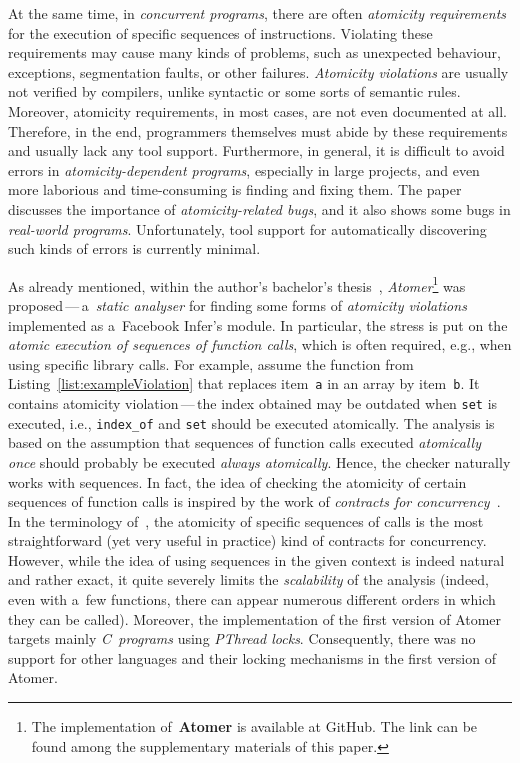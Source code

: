 \documentclass{ExcelAtFIT}
\theoremstyle{example}
\begin{document}
At the same time, in \emph{concurrent programs}, there are often \emph{atomicity requirements} for the execution of specific sequences of instructions. Violating these requirements may cause many kinds of problems, such as unexpected behaviour, exceptions, segmentation faults, or other failures. \emph{Atomicity violations} are usually not verified by compilers, unlike syntactic or some sorts of semantic rules. Moreover, atomicity requirements, in most cases, are not even documented at all. Therefore, in the end, programmers themselves must abide by these requirements and usually lack any tool support. Furthermore, in general, it is difficult to avoid errors in \emph{atomicity-dependent programs}, especially in large projects, and even more laborious and time-consuming is finding and fixing them. The paper~\cite{contracts2017} discusses the importance of \emph{atomicity-related bugs}, and it also shows some bugs in \emph{real-world programs}. Unfortunately, tool support for automatically discovering such kinds of errors is currently minimal.

As already mentioned, within the author's bachelor's thesis~\cite{harmimBP}, \emph{Atomer}\footnote{The implementation of~\textbf{Atomer} is available at GitHub. The link can be found among the supplementary materials of this paper.} was proposed\,---\,a~\emph{static analyser} for finding some forms of \emph{atomicity violations} implemented as a~Facebook Infer's module. In particular, the stress is put on the \emph{atomic execution of sequences of function calls}, which is often required, e.g., when using specific library calls. For example, assume the function from Listing~\ref{list:exampleViolation} that replaces item~\texttt{a} in an array by item~\texttt{b}. It contains atomicity violation\,---\,the index obtained may be outdated when \texttt{set} is executed, i.e., \texttt{index\_of} and \texttt{set} should be executed atomically. The analysis is based on the assumption that sequences of function calls executed \emph{atomically once} should probably be executed \emph{always atomically}. Hence, the checker naturally works with sequences. In fact, the idea of checking the atomicity of certain sequences of function calls is inspired by the work of \emph{contracts for concurrency}~\cite{contracts2017}. In the terminology of~\cite{contracts2017}, the atomicity of specific sequences of calls is the most straightforward (yet very useful in practice) kind of contracts for concurrency. However, while the idea of using sequences in the given context is indeed natural and rather exact, it quite severely limits the \emph{scalability} of the analysis (indeed, even with a~few functions, there can appear numerous different orders in which they can be called). Moreover, the implementation of the first version of Atomer targets mainly \emph{C~programs} using \emph{PThread locks}. Consequently, there was no support for other languages and their locking mechanisms in the first version of Atomer.
\end{document}
